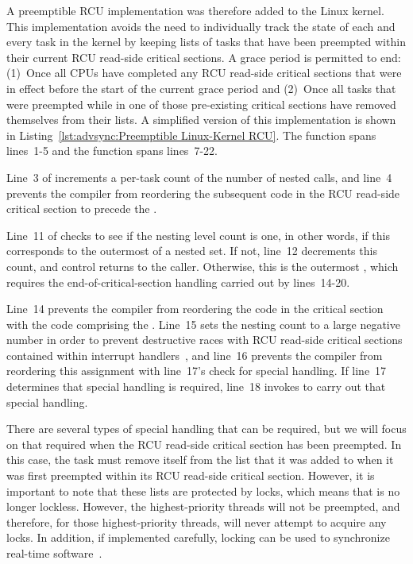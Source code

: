 A preemptible RCU implementation was therefore added to the Linux kernel.
This implementation avoids the need to individually track the state of
each and every task in the kernel by keeping lists of tasks that have
been preempted within their current RCU read-side critical sections.
A grace period is permitted to end: (1)~Once all CPUs have completed any
RCU read-side critical sections that were in effect before the start
of the current grace period and
(2)~Once all tasks that were preempted
while in one of those pre-existing critical sections have removed
themselves from their lists.
A simplified version of this implementation is shown in
Listing~\ref{lst:advsync:Preemptible Linux-Kernel RCU}.
The  function spans lines~1-5 and
the  function spans lines~7-22.

Line~3 of  increments a per-task count of the
number of nested  calls, and
line~4 prevents the compiler from reordering the subsequent code in the
RCU read-side critical section to precede the .

Line~11 of  checks to see if the nesting level count
is one, in other words, if this corresponds to the outermost
 of a nested set.
If not, line~12 decrements this count, and control returns to the caller.
Otherwise, this is the outermost , which requires
the end-of-critical-section handling carried out by lines~14-20.

Line~14 prevents the compiler from reordering the code in the critical
section with the code comprising the .
Line~15 sets the nesting count to a large negative number in order to prevent
destructive races with RCU read-side critical sections contained within
interrupt handlers~\cite{PaulEMcKenney2011RCU3.0trainwreck},
and line~16 prevents the compiler from reordering this assignment with
line~17's check for special handling.
If line~17 determines that special handling is required, line~18
invokes  to carry out that special handling.

There are several types of special handling that can be required, but
we will focus on that required when the RCU read-side critical section
has been preempted.
In this case, the task must remove itself from the list that it was
added to when it was first preempted within its
RCU read-side critical section.
However, it is important to note that these lists are protected by locks,
which means that  is no longer lockless.
However, the highest-priority threads will not be preempted, and therefore,
for those highest-priority threads,  will never
attempt to acquire any locks.
In addition, if implemented carefully, locking can be used to synchronize
real-time software~\cite{BjoernBrandenburgPhD}.

